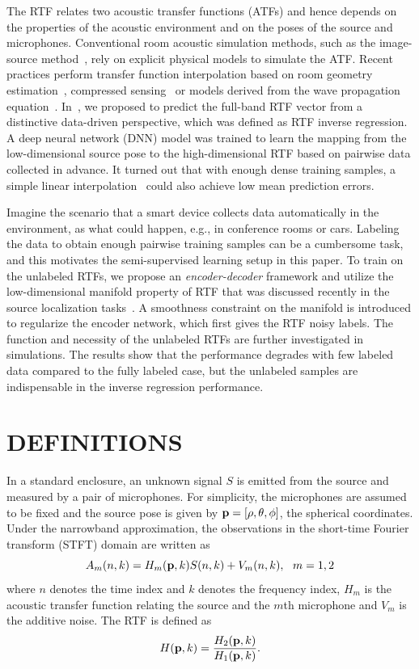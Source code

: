\documentclass{article}
\begin{document}
The RTF relates two acoustic transfer functions (ATFs) and hence depends on the properties of the acoustic environment and on the poses of the source and microphones. Conventional room acoustic simulation methods, such as the image-source method~\cite{allen1979image}, rely on explicit physical models to simulate the ATF. Recent practices perform transfer function interpolation based on room geometry estimation~\cite{asaei2014structured}, compressed sensing~\cite{mignot2013room,mignot2014low} or models derived from the wave propagation equation~\cite{samarasinghe2015efficient}. In~\cite{rtfinv2017}, we proposed to predict the full-band RTF vector from a distinctive data-driven perspective, which was defined as RTF inverse regression. A deep neural network (DNN) model was trained to learn the mapping from the low-dimensional source pose to the high-dimensional RTF based on pairwise data collected in advance. It turned out that with enough dense training samples, a simple linear interpolation~\cite{vincent2013second} could also achieve low mean prediction errors.

Imagine the scenario that a smart device collects data automatically in the environment, as what could happen, e.g., in conference rooms or cars. Labeling the data to obtain enough pairwise training samples can be a cumbersome task, and this motivates the semi-supervised learning setup in this paper. To train on the unlabeled RTFs, we propose an \emph{encoder-decoder} framework and utilize the low-dimensional manifold property of RTF that was discussed recently in the source localization tasks~\cite{deleforge20122d,laufer2013relative,deleforge2015acoustic,laufer2016mr}. A smoothness constraint on the manifold is introduced to regularize the encoder network, which first gives the RTF noisy labels. The function and necessity of the unlabeled RTFs are further investigated in simulations. The results show that the performance degrades with few labeled data compared to the fully labeled case, but the unlabeled samples are indispensable in the inverse regression performance.

\section{DEFINITIONS}
\label{sec:defs}

In a standard enclosure, an unknown signal $S$ is emitted from the source and measured by a pair of microphones. For simplicity, the microphones are assumed to be fixed and the source pose is given by ${\bf p}=[\rho,\theta,\phi]$, the spherical coordinates. Under the narrowband approximation, the observations in the short-time Fourier transform (STFT) domain are written as
\begin{equation}\label{eq:sigfreq}
  A_m(n,k) = H_m({\bf p},k)S(n,k) + V_m(n,k), ~~m=1,2
\end{equation}
where $n$ denotes the time index and $k$ denotes the frequency index, $H_m$ is the acoustic transfer function relating the source and the $m$th microphone and $V_m$ is the additive noise. The RTF is defined as
\begin{equation}\label{eq:rtf}
  H({\bf p}, k) = \frac{H_2({\bf p}, k)}{H_1({\bf p}, k)}.
\end{equation}
\end{document}
